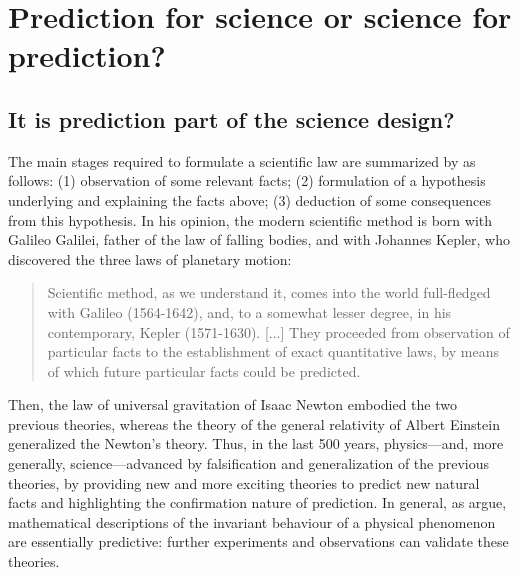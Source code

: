 \documentclass{statsoc}
\begin{document}
\section{Prediction for science or science for prediction?}
\label{sec:pred}

\subsection{It is prediction part of the science design?}

\color{black}

The main stages required to formulate a scientific law are summarized by \cite{russell2017scientific} as follows:
(1) observation of some relevant facts;
(2) formulation of a hypothesis underlying and explaining the facts above;
(3) deduction of some consequences from this hypothesis.
In his opinion, the modern scientific method is born with Galileo Galilei, father of the law of falling bodies, and with Johannes Kepler, who discovered the three laws of planetary motion:
%
 \begin{quote}
Scientific method, as we understand it, comes into the
world full-fledged with Galileo (1564-1642), and, to a
somewhat lesser degree, in his contemporary, Kepler
(1571-1630). [...] They proceeded from observation of
particular facts to the establishment of exact quantitative
laws, by means of which future particular facts could be
predicted.
\end{quote}
%
 Then, the law of universal gravitation of Isaac Newton embodied the two previous theories, whereas the theory of the general relativity of Albert Einstein generalized the Newton's theory.
Thus, in the last 500 years, physics---and, more generally, science---advanced by falsification and generalization of the previous theories, by providing new and more exciting theories to predict new natural facts and highlighting the confirmation nature of prediction. In general,  as \cite{hitchcock2004prediction} argue,   mathematical descriptions of the 
invariant behaviour of a physical phenomenon are essentially predictive: further experiments and observations can validate these theories. 
\end{document}
